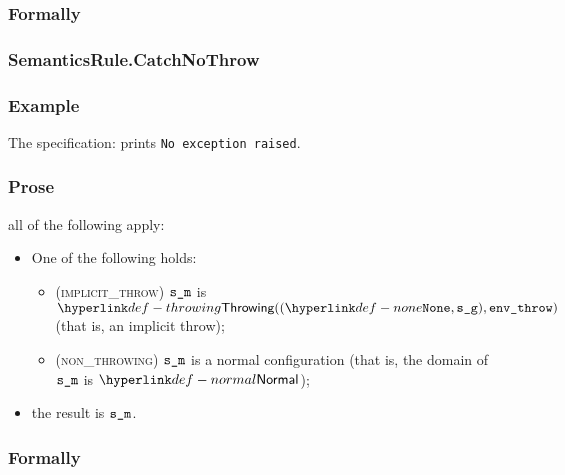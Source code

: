 \subsubsection{Formally}
\begin{mathpar}
\end{mathpar}

\subsubsection{SemanticsRule.CatchNoThrow\label{sec:SemanticsRule.CatchNoThrow}}
\subsubsection{Example}
The specification:
prints \texttt{No exception raised}.

\subsubsection{Prose}
all of the following apply:
\begin{itemize}
  \item One of the following holds:
  \begin{itemize}
    \item (\textsc{implicit\_throw}) $\sm$ is $\Throwing((\None, \sg), \envthrow)$ (that is, an implicit throw);
    \item (\textsc{non\_throwing}) $\sm$ is a normal configuration (that is, the domain of $\sm$ is $\Normal$);
  \end{itemize}
  \item the result is $\sm$.
\end{itemize}

\subsubsection{Formally}
\begin{mathpar}
\end{mathpar}


